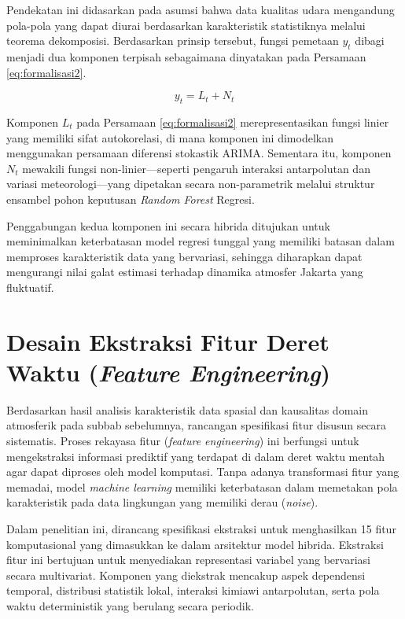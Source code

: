 Pendekatan ini didasarkan pada asumsi bahwa data kualitas udara mengandung pola-pola yang dapat diurai berdasarkan karakteristik statistiknya melalui teorema dekomposisi. Berdasarkan prinsip tersebut, fungsi pemetaan $y_t$ dibagi menjadi dua komponen terpisah sebagaimana dinyatakan pada Persamaan \ref{eq:formalisasi2}.

\begin{equation}
    y_t = L_t + N_t
    \label{eq:formalisasi2}
\end{equation}

Komponen $L_t$ pada Persamaan \ref{eq:formalisasi2} merepresentasikan fungsi linier yang memiliki sifat autokorelasi, di mana komponen ini dimodelkan menggunakan persamaan diferensi stokastik ARIMA. Sementara itu, komponen $N_t$ mewakili fungsi non-linier—seperti pengaruh interaksi antarpolutan dan variasi meteorologi—yang dipetakan secara non-parametrik melalui struktur ensambel pohon keputusan \textit{Random Forest} Regresi. 

\newpage

Penggabungan kedua komponen ini secara hibrida ditujukan untuk meminimalkan keterbatasan model regresi tunggal yang memiliki batasan dalam memproses karakteristik data yang bervariasi, sehingga diharapkan dapat mengurangi nilai galat estimasi terhadap dinamika atmosfer Jakarta yang fluktuatif.

\section{Desain Ekstraksi Fitur Deret Waktu (\textit{Feature Engineering})}

Berdasarkan hasil analisis karakteristik data spasial dan kausalitas domain atmosferik pada subbab sebelumnya, rancangan spesifikasi fitur disusun secara sistematis. Proses rekayasa fitur (\textit{feature engineering}) ini berfungsi untuk mengekstraksi informasi prediktif yang terdapat di dalam deret waktu mentah agar dapat diproses oleh model komputasi. Tanpa adanya transformasi fitur yang memadai, model \textit{machine learning} memiliki keterbatasan dalam memetakan pola karakteristik pada data lingkungan yang memiliki derau (\textit{noise}).

Dalam penelitian ini, dirancang spesifikasi ekstraksi untuk menghasilkan 15 fitur komputasional yang dimasukkan ke dalam arsitektur model hibrida. Ekstraksi fitur ini bertujuan untuk menyediakan representasi variabel yang bervariasi secara multivariat. Komponen yang diekstrak mencakup aspek dependensi temporal, distribusi statistik lokal, interaksi kimiawi antarpolutan, serta pola waktu deterministik yang berulang secara periodik.

